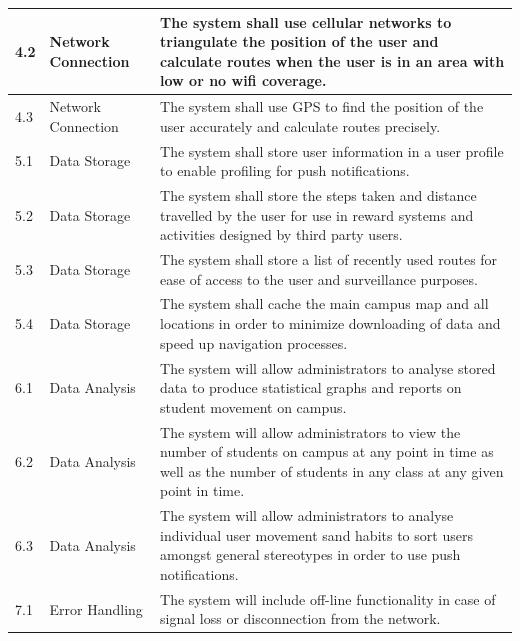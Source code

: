 \documentclass[11pt]{article}
\begin{document}
\begin{longtable}{|p{}| p{} | p{} |}
4.2& Network Connection & The system shall use cellular networks to triangulate the position of the user and calculate routes when the user is in an area with low or no wifi coverage.\\

\hline

4.3& Network Connection & The system shall use GPS to find the position of the user accurately and calculate routes precisely.\\
\hline

5.1& Data Storage & The system shall store user information in a user profile to enable profiling for push notifications.\\

\hline

5.2& Data Storage & The system shall store the steps taken and distance travelled by the user for use in reward systems and activities designed by third party users.\\

\hline

5.3& Data Storage & The system shall store a list of recently used routes for ease of access to the user and surveillance purposes.\\

\hline

5.4& Data Storage & The system shall cache the main campus map and all locations in order to minimize downloading of data and speed up navigation processes.\\

\hline

6.1& Data Analysis & The system will allow administrators to analyse stored data to produce statistical graphs and reports on student movement on campus.\\

\hline

6.2& Data Analysis & The system will allow administrators to view the number of students on campus at any point in time as well as the number of students in any class at any given point in time.\\

\hline

6.3& Data Analysis & The system will allow administrators to analyse individual user movement sand habits to sort users amongst general stereotypes in order to use push notifications.\\

\hline

7.1& Error Handling & The system will include off-line functionality in case of signal loss or disconnection from the network.\\


\end{longtable}
\end{document}
